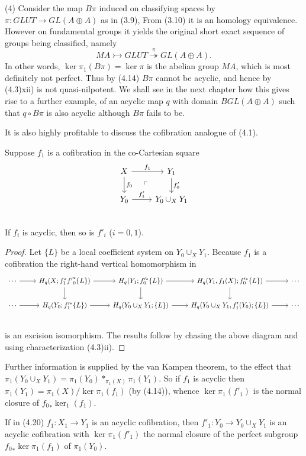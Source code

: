 \begin{ex}
(4) Consider the map $B\pi$ induced on classifying spaces by $\pi \colon   GLUT \longrightarrow GL(A\oplus A)$ as in (3.9), From (3.10) it is an homology equivalence. However on fundamental groups it yields the original short exact sequence of groups being classified, namely
\[ MA \rightarrowtail GLUT \overset{\pi}\twoheadrightarrow GL(A\oplus A).\]
In other words, $\ker \pi_1(B\pi) = \ker \pi$ is the abelian group $MA$, which is most definitely not perfect. Thus by (4.14) $B\pi$  cannot be acyclic, and hence by (4.3)xii) is not quasi-nilpotent. We shall see
in the next chapter how this gives rise to a further example, of an acyclic map $q$ with domain $BGL(A\oplus A)$ such that $q\circ B\pi$  is also acyclic although $B\pi$  fails to be.
\end{ex}
It is also highly profitable to discuss the cofibration analogue of (4.1).
\begin{prop}
  Suppose $f_1$ is a cofibration in the co-Cartesian square
\[
\begin{tikzcd}
X \arrow{r}{f_1} \arrow{d}{f_0} \arrow[dr, phantom, "\ulcorner"]& Y_1 \arrow{d}{f'_0}\\
Y_0 \arrow{r}{f'_1} & Y_0\cup_X Y_1 \\
\end{tikzcd}
\]
If $f_i$ is acyclic, then so is $f'_i$ ($i = 0,1$).
\end{prop}
\begin{proof}
Let $\{ L\}$ be a local coefficient system on $Y_0\cup_X Y_1$. Because $f_1$ is a cofibration the right-hand vertical homomorphism in
\[\begin{tikzcd}
\cdots \arrow{r} & H_q(X;f_1^* {f'}_0^*\{L\}) \arrow{r} \arrow{d} &
 H_q(Y_1;f'^*_0\{L\}) \arrow{r} \arrow{d} &
  H_q(Y_1,f_1(X);f'^*_0\{L\})\arrow{d} \arrow{r} & \cdots \\
\cdots \arrow{r} & H_q(Y_0;f'^*_1\{L\}) \arrow{r} &
 H_q(Y_0\cup_X Y_1;\{L\}) \arrow{r}  &
  H_q(Y_0\cup_X Y_1,f'_1(Y_0);\{L\}) \arrow{r} & \cdots \\
\end{tikzcd}\]
 is an excision isomorphism. The results follow by chasing the above diagram and using characterization (4.3)ii).
\end{proof}

Further information is supplied by the van Kampen theorem, to the effect that  $\pi_1(Y_0\cup_X Y_1) = \pi_1(Y_0)*_{\pi_1(X)}\pi_1(Y_1)$. So if $f_1$ is acyclic then $\pi_1(Y_1)=\pi_1(X)/\ker \pi_1(f_1) $
(by (4.14)), whence $\ker \pi_1(f'_1)$ is the normal closure of ${f_0}_*\ker_1(f_1)$.
\begin{prop}
  If in (4.20) $f_1\colon  X_1\longrightarrow Y_1$ is an acyclic cofibration, then $f'_1\colon  Y_0\longrightarrow Y_0\cup_X Y_1$ is an
acyclic cofibration with $\ker \pi_1(f'_1)$ the normal closure of the perfect subgroup ${f_0}_* \ker \pi_1(f_1)$ of $\pi_1(Y_0)$.
\end{prop}
 

